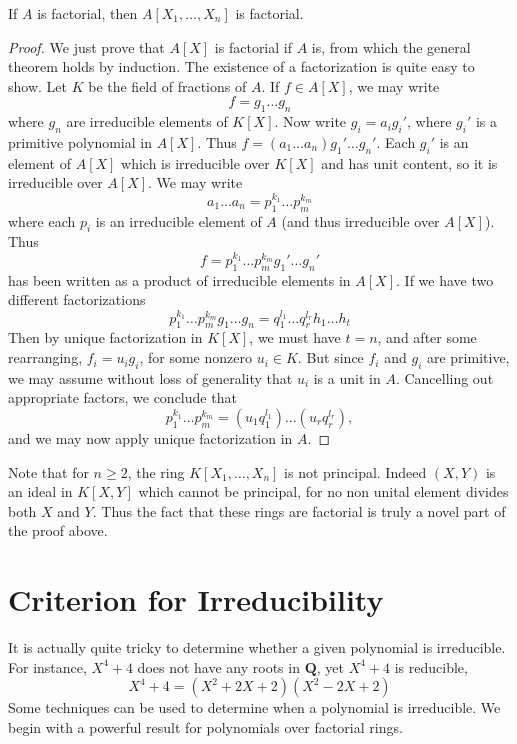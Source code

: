 \begin{corollary}
    If $A$ is factorial, then $A[X_1, \dots, X_n]$ is factorial.
\end{corollary}
\begin{proof}
    We just prove that $A[X]$ is factorial if $A$ is, from which the general theorem holds by induction. The existence of a factorization is quite easy to show. Let $K$ be the field of fractions of $A$. If $f \in A[X]$, we may write
    \[ f = g_1 \dots g_n \]
    where $g_n$ are irreducible elements of $K[X]$. Now write $g_i = a_i g_i'$, where $g_i'$ is a primitive polynomial in $A[X]$. Thus $f = (a_1 \dots a_n) g_1' \dots g_n'$. Each $g_i'$ is an element of $A[X]$ which is irreducible over $K[X]$ and has unit content, so it is irreducible over $A[X]$. We may write
    \[ a_1 \dots a_n = p_1^{k_1} \dots p_m^{k_m} \]
    where each $p_i$ is an irreducible element of $A$ (and thus irreducible over $A[X]$). Thus
    \[ f = p_1^{k_1} \dots p_m^{k_m} g_1' \dots g_n' \]
    has been written as a product of irreducible elements in $A[X]$. If we have two different factorizations
    \[ p_1^{k_1} \dots p_m^{k_m}  g_1 \dots g_n = q_1^{l_1} \dots q_r^{l_r} h_1 \dots h_t \]
    Then by unique factorization in $K[X]$, we must have $t = n$, and after some rearranging, $f_i = u_i g_i$, for some nonzero $u_i \in K$. But since $f_i$ and $g_i$ are primitive, we may assume without loss of generality that $u_i$ is a unit in $A$. Cancelling out appropriate factors, we conclude that
    \[ p_1^{k_1} \dots p_m^{k_m} = (u_1 q_1^{l_1}) \dots (u_r q_r^{l_r}), \]
    and we may now apply unique factorization in $A$.
\end{proof}

Note that for $n \geq 2$, the ring $K[X_1, \dots, X_n]$ is not principal. Indeed $(X,Y)$ is an ideal in $K[X,Y]$ which cannot be principal, for no non unital element divides both $X$ and $Y$. Thus the fact that these rings are factorial is truly a novel part of the proof above.





\section{Criterion for Irreducibility}

It is actually quite tricky to determine whether a given polynomial is irreducible. For instance, $X^4 + 4$ does not have any roots in $\mathbf{Q}$, yet $X^4 + 4$ is reducible,
%
\[ X^4 + 4 = (X^2 + 2X + 2)(X^2 - 2X + 2) \]
%
Some techniques can be used to determine when a polynomial is irreducible. We begin with a powerful result for polynomials over factorial rings.

